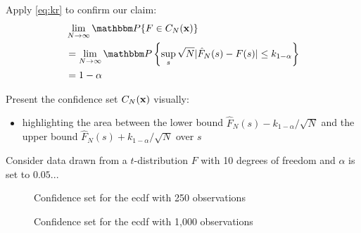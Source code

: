 \begin{frame}
    
    \vspace{2em}
    Apply \eqref{eq:kr} to confirm our claim:
    \begin{align*}
        & \lim_{N \to \infty} \PP \{ F \in C_N(\boldx) \}\\
        & = \lim_{N \to \infty} \PP 
         \left\{ \sup_s \sqrt{N}|\hat F_N(s) - F(s)| \leq k_{1-\alpha} \right\}\\
        & = 1 - \alpha
    \end{align*}
    
    
\end{frame}

\begin{frame}
    
    \vspace{2em}
    Present the confidence set $C_N({\mathbf x})$ visually:
    
    \begin{itemize}
        \item highlighting the
    area between the lower bound $\hat F_N(s) - k_{1-\alpha}/\sqrt{N}$ and the
    upper bound $\hat F_N(s) + k_{1-\alpha}/\sqrt{N}$ over $s$
    \end{itemize}
   
   \vspace{.7em}
    Consider data  drawn from a
    $t$-distribution $F$ with 10 degrees of freedom and $\alpha$ is set to $0.05$...

\end{frame}

\begin{frame}

    \begin{figure}
    \centering
    \caption{\label{f:ks_sim1} Confidence set for the {\sc ecdf} with 250 observations}
    \end{figure}

\end{frame}

\begin{frame}

    \begin{figure}
    \centering
    \caption{\label{f:ks_sim2} Confidence set for the {\sc ecdf} with 1,000 observations}
    \end{figure}
    
\end{frame}

